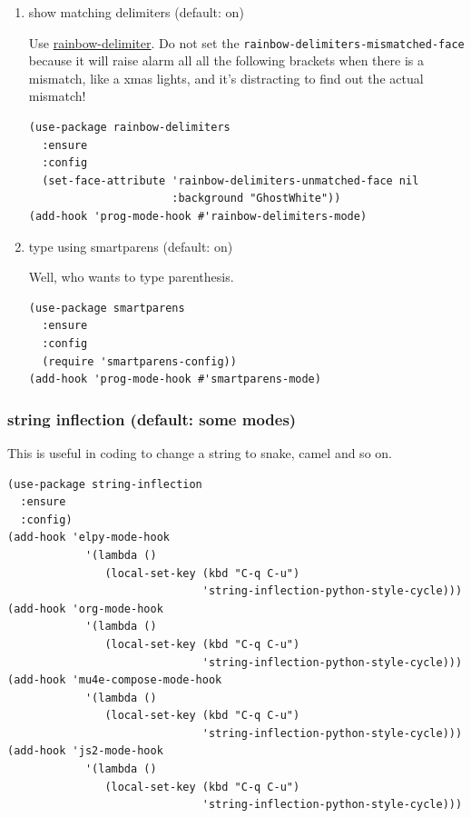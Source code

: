 \documentclass[11pt]{article}
\begin{document}
\begin{enumerate}
\item show matching delimiters (default: on)
\label{sec:orgad281b3}

Use \href{https://github.com/Fanael/rainbow-delimiters}{rainbow-delimiter}. Do not set the
\texttt{rainbow-delimiters-mismatched-face} because it will raise alarm all all
the following brackets when there is a mismatch, like a xmas lights,
and it's distracting to find out the actual mismatch!

\begin{verbatim}
(use-package rainbow-delimiters
  :ensure
  :config
  (set-face-attribute 'rainbow-delimiters-unmatched-face nil
                      :background "GhostWhite"))
(add-hook 'prog-mode-hook #'rainbow-delimiters-mode)
\end{verbatim}
\item type using smartparens (default: on)
\label{sec:orgc5a38e6}

Well, who wants to type parenthesis.

\begin{verbatim}
(use-package smartparens
  :ensure
  :config
  (require 'smartparens-config))
(add-hook 'prog-mode-hook #'smartparens-mode)
\end{verbatim}
\end{enumerate}
\subsubsection{string inflection (default: some modes)}
\label{sec:orgf498d90}

This is useful in coding to change a string to snake, camel and so on.

\begin{verbatim}
(use-package string-inflection
  :ensure
  :config)
(add-hook 'elpy-mode-hook
            '(lambda ()
               (local-set-key (kbd "C-q C-u")
                              'string-inflection-python-style-cycle)))
(add-hook 'org-mode-hook
            '(lambda ()
               (local-set-key (kbd "C-q C-u")
                              'string-inflection-python-style-cycle)))
(add-hook 'mu4e-compose-mode-hook
            '(lambda ()
               (local-set-key (kbd "C-q C-u")
                              'string-inflection-python-style-cycle)))
(add-hook 'js2-mode-hook
            '(lambda ()
               (local-set-key (kbd "C-q C-u")
                              'string-inflection-python-style-cycle)))
\end{verbatim}
\end{document}
